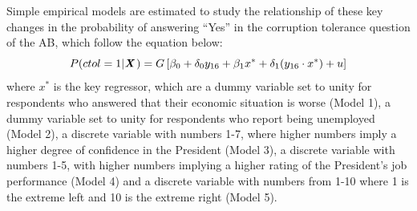 \documentclass[floatsintext,man]{apa7}\usepackage[]{graphicx}\usepackage[]{color}
\begin{document}
Simple empirical models are estimated to study the relationship of these key changes in the probability of answering \enquote{Yes} in the corruption tolerance question of the AB, which follow the equation below:
\begin{equation}
\label{eqn:simplemod}
P(ctol = 1 | \textbf{\textit{X}} \hspace{0.04cm}) = G \left[ \beta_0 + \delta_0 y_{16} + \beta_1 x^* + \delta_1 (y_{16} \cdot x^*) + u\right]
\end{equation}
where $x^*$ is the key regressor, which are a dummy variable set to unity for respondents who answered that their economic situation is worse (Model 1), a dummy variable set to unity for respondents who report being unemployed (Model 2), a discrete variable with numbers 1-7, where higher numbers imply a higher degree of confidence in the President (Model 3), a discrete variable with numbers 1-5, with higher numbers implying a higher rating of the President's job performance (Model 4) and a discrete variable with numbers from 1-10 where 1 is the extreme left and 10 is the extreme right (Model 5). 
\end{document}
